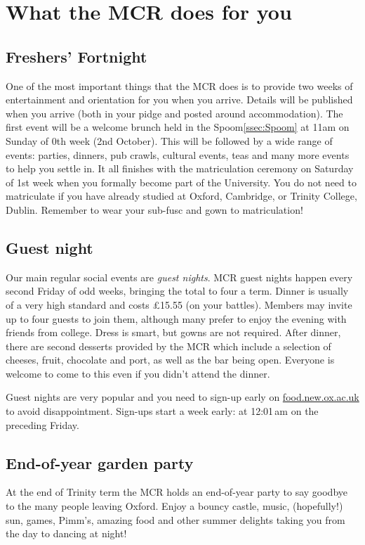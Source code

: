 
\chapter{What the MCR does for you}

\section{Freshers' Fortnight}
One of the most important things that the MCR does is to provide two weeks of
entertainment and orientation for you when you arrive. Details will be published
when you arrive (both in your pidge and posted around accommodation). The first event will be a welcome brunch held in the  Spoom\ref{ssec:Spoom} at 11am on Sunday of 0th week (2nd
October).
This will be followed by a wide range of events: parties, dinners, pub crawls, cultural events, teas and many more events to help you settle in. It all finishes with the matriculation ceremony on Saturday of 1st week when you formally become part of the University. You do not need to matriculate if you have already studied at Oxford, Cambridge, or Trinity College, Dublin. Remember to wear your sub-fusc and gown to matriculation!

\section{Guest night}
Our main regular social events are \emph{guest nights}. MCR guest nights happen
every second Friday of odd weeks, bringing the total to four a term. Dinner is usually of a very
high standard and costs \pounds15.55 (on your battles). Members may invite up to four guests to
join them, although many prefer to enjoy the evening with friends from college. Dress is smart, but gowns are not required. After dinner, there are second desserts provided by the MCR which include a selection of cheeses, fruit, chocolate and port, as well as the bar being open. Everyone is welcome to come to this even if you didn't attend the dinner.

Guest nights are very popular and you need to sign-up early on
\url{food.new.ox.ac.uk} to avoid disappointment. Sign-ups start a week early: at
12:01\,am on the preceding Friday.

\section{End-of-year garden party} 
At the end of Trinity term the MCR holds an end-of-year party to say goodbye to the many people
leaving Oxford. Enjoy a bouncy castle, music, (hopefully!) sun, games, Pimm’s, amazing food and other summer delights taking you from the day to dancing at night!

